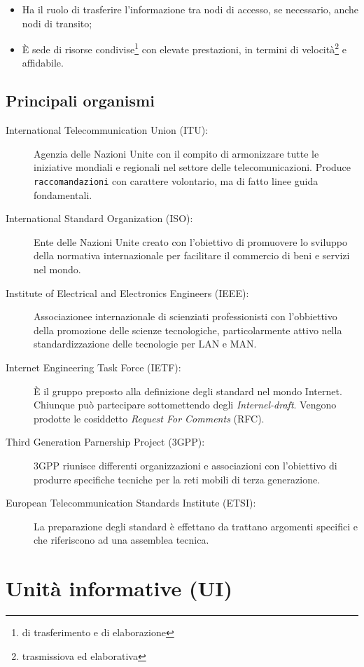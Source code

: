 \begin{itemize}
\item Ha il ruolo di trasferire l'informazione tra nodi di accesso, se necessario, anche nodi di transito;
\item È sede di risorse condivise\footnote{di trasferimento e di elaborazione} con elevate prestazioni, in
  termini di velocità\footnote{trasmissiova ed elaborativa} e affidabile.
\end{itemize}
\subsection{Principali organismi}
\label{sec:princorg}

\begin{description}
\item[International Telecommunication Union (ITU):] Agenzia delle Nazioni Unite con il compito di armonizzare
  tutte le iniziative mondiali e regionali nel settore delle telecomunicazioni. Produce \texttt{raccomandazioni}
  con carattere volontario, ma di fatto linee guida fondamentali.
\item[International Standard Organization (ISO):] Ente delle Nazioni Unite creato con l'obiettivo di promuovere lo
  sviluppo della normativa internazionale per facilitare il commercio di beni e servizi nel mondo.
\item[Institute of Electrical and Electronics Engineers (IEEE):] Associazionee internazionale di scienziati
  professionisti con l'obbiettivo della promozione delle scienze tecnologiche, particolarmente attivo nella
  standardizzazione delle tecnologie per LAN e MAN.
\item[Internet Engineering Task Force (IETF):] È il gruppo preposto alla definizione degli standard nel mondo
  Internet. Chiunque può partecipare sottomettendo degli \textit{Internel-draft}. Vengono prodotte le cosiddetto
  \textit{Request For Comments} (RFC).
\item[Third Generation Parnership Project (3GPP):] 3GPP riunisce differenti organizzazioni e associazioni con
  l'obiettivo di produrre specifiche tecniche per la reti mobili di terza generazione.
\item[European Telecommunication Standards Institute (ETSI):] La preparazione degli standard è effettano
  da trattano argomenti specifici e che riferiscono ad una assemblea tecnica.
\end{description}
\section{Unità informative (UI)}
\label{sec:unitinfo}

